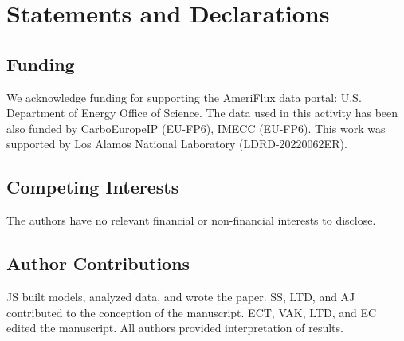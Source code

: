\documentclass{article}
\begin{document}




\section*{Statements and Declarations}

\subsection*{Funding}

We acknowledge funding for supporting the AmeriFlux data portal: U.S. Department of Energy Office of Science. The data used in this activity has been also funded by CarboEuropeIP (EU-FP6), IMECC (EU-FP6). This work was supported by Los Alamos National Laboratory (LDRD-20220062ER).

\subsection*{Competing Interests}

The authors have no relevant financial or non-financial interests to disclose.

\subsection*{Author Contributions}

JS built models, analyzed data, and wrote the paper. SS, LTD, and AJ contributed to the conception of the manuscript. ECT, VAK, LTD, and EC edited the manuscript. All authors provided interpretation of results. 
\end{document}
